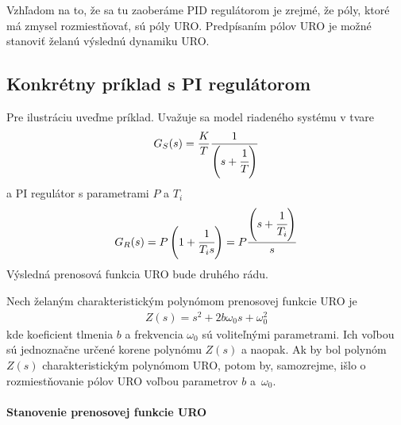 \documentclass[a4paper, 10pt, ]{article}
\begin{document}
Vzhľadom na to, že sa tu zaoberáme PID regulátorom je zrejmé, že póly, ktoré má zmysel rozmiestňovať, sú póly URO. Predpísaním pólov URO je možné stanoviť želanú výslednú dynamiku URO.


\subsection{Konkrétny príklad s PI regulátorom}

Pre ilustráciu uveďme príklad. Uvažuje sa model riadeného systému v tvare
\begin{align}
    G_S(s) = \frac{K}{T} \frac{1}{ \left(s+\cfrac{1}{T}\right)}
\end{align}
a PI regulátor s parametrami $P$ a $T_i$ 
\begin{align}
    G_R(s) = P \left( 1 + \cfrac{1}{T_i s}\right) = P \frac{ \left(s+\cfrac{1}{T_i}\right) }{s}
\end{align}
Výsledná prenosová funkcia URO bude druhého rádu. 

Nech želaným charakteristickým polynómom prenosovej funkcie URO je
\begin{align}
    Z(s) = s^2 + 2 b \omega_0 s + \omega_0^2
\end{align}
kde koeficient tlmenia $b$ a frekvencia $\omega_0$ sú voliteľnými parametrami. Ich voľbou sú jednoznačne určené korene polynómu $Z(s)$ a naopak. Ak by bol polynóm $Z(s)$ charakteristickým polynómom URO, potom by, samozrejme, išlo o rozmiestňovanie pólov URO voľbou parametrov $b$ a~$\omega_0$.







\paragraph{Stanovenie prenosovej funkcie URO}
\end{document}
